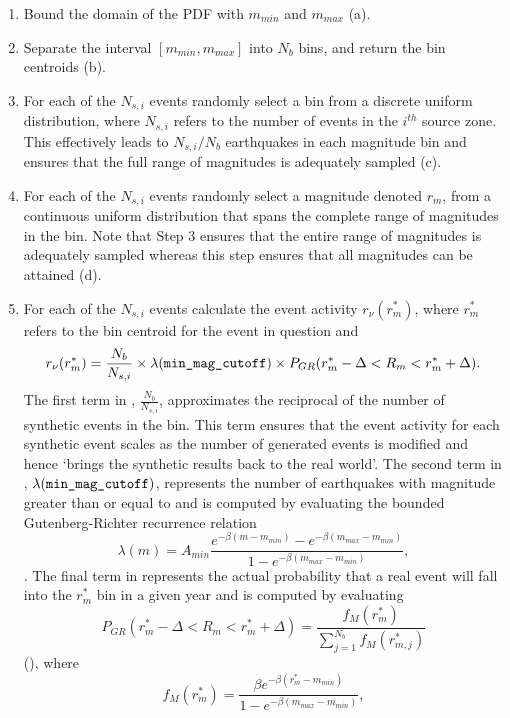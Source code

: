 \begin{enumerate}
\item Bound the domain of the PDF with $m_{min}$ and $m_{max}$
(a).

\item Separate the interval $[m_{min}, m_{max}]$ into $N_b$ bins,
and return the bin centroids (b).

\item For each of the $N_{s,i}$ events randomly select a bin from
a discrete uniform
  distribution, where $N_{s,i}$ refers to the number of events in the $i^{th}$ source zone.
  This effectively leads to $N_{s,i}/N_b$ earthquakes in
  each magnitude bin and ensures that the full range of magnitudes
  is adequately sampled (c).

\item For each of the $N_{s,i}$ events randomly select a magnitude
denoted $r_m$, from a
  continuous uniform distribution that spans the complete range of magnitudes in the
  bin. Note that Step 3 ensures that the entire range of magnitudes is
  adequately sampled whereas this step ensures that all magnitudes can be
  attained (d).

\item For each of the $N_{s,i}$ events calculate the event
activity $r_\nu(r_m^*)$, where $r_m^*$ refers to the bin centroid
for the event in question and
\begin{equation}
\label{eq:event-activity} r_\nu(r_m^*) = \frac{N_b}{N_{s,i}}
\times \lambda(\typepar{min}{\_mag}{\_cutoff}) \times
P_{GR}(r_m^*-\Delta<R_m<r_m^*+\Delta).
\end{equation}
The first term in , $\frac{N_b}{N_{s,i}}$,
approximates the reciprocal of the number of synthetic events in
the bin. This term ensures that the event activity for each
synthetic event scales as the number of generated events is
modified and hence `brings the synthetic results back to the real
world'. The second term in ,
$\lambda(\typepar{min}{\_mag}{\_cutoff})$, represents the number
of earthquakes with magnitude greater than or equal to
 and is computed by evaluating the
bounded Gutenberg-Richter recurrence relation
\begin{equation}
\lambda(m) =
A_{min}\frac{e^{-\beta(m-m_{min})}-e^{-\beta(m_{max}-m_{min})}}{1-e^{-\beta(m_{max}-m_{min})}},
\end{equation}
\citep{dr_Kramer96a}. The final term in 
represents the actual probability that a real event will fall into
the $r_m^*$ bin in a given year and is computed by evaluating
\begin{equation}
P_{GR}(r_m^*-\Delta<R_m<r_m^*+\Delta) =
\frac{f_M(r_m^*)}{\sum\limits_{j=1}^{N_b} f_M(r_{m,j}^*)}
\end{equation}
(), where
\begin{equation}
f_M(r_m^*) = \frac{\beta
e^{-\beta(r_m^*-m_{min})}}{1-e^{-\beta(m_{max}-m_{min})}},
\end{equation}


\end{enumerate}
